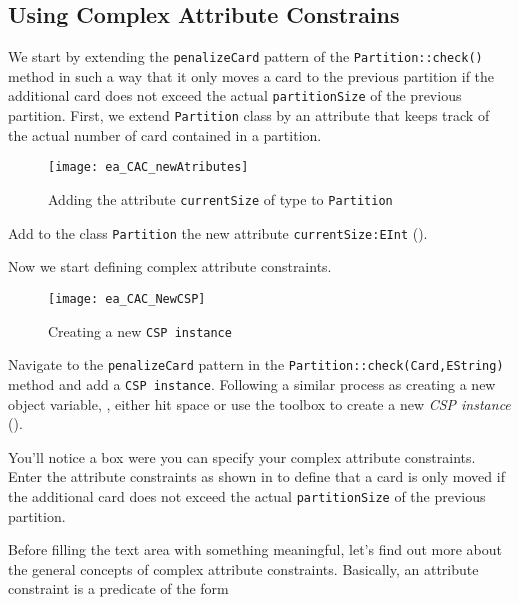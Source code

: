 \subsection{Using Complex Attribute Constrains}     
We start by extending the \texttt{penalizeCard} pattern of the \texttt{Partition::check()} method in such a way that it only moves a card to the previous partition if the additional card does not exceed the actual \texttt{partitionSize} of the previous partition.
First, we extend \texttt{Partition} class by an attribute that keeps track of the actual number of card contained in a partition.
\begin{figure}[htbp]
\begin{center}
  \texttt{[image: ea\_CAC\_newAtributes]}
  \caption{Adding the attribute \texttt{currentSize} of type  to \texttt{Partition}}  
  \label{ea_CAC_newAtributes}
\end{center}
\end{figure}
%
\begin{stepbystep}    
\item Add to the class \texttt{Partition} the new attribute \texttt{currentSize:EInt} ().
\end{stepbystep} 
%
Now we start defining complex attribute constraints.
\begin{figure}[htbp]
\begin{center}
  \texttt{[image: ea\_CAC\_NewCSP]}
  \caption{Creating a new \texttt{CSP instance}}  
  \label{ea:CAC_NewCSP}
\end{center}
\end{figure}
\begin{stepbystep}
%
\item Navigate to the \texttt{penalizeCard} pattern in the \texttt{Partition::check(Card,EString)} method and add a \texttt{CSP instance}.
Following a similar process as creating a new object variable, \idest, either hit space or use the toolbox to create a new \emph{CSP instance} ().
%
\item You’ll notice a box were you can specify your complex attribute constraints. Enter the attribute constraints as shown in  to define that a card is only moved if the additional card does not exceed the actual \texttt{partitionSize} of the previous partition.

\end{stepbystep}

Before filling the text area with something meaningful, let's find out more about the general concepts of complex attribute constraints.
Basically, an attribute constraint is a predicate of the form

